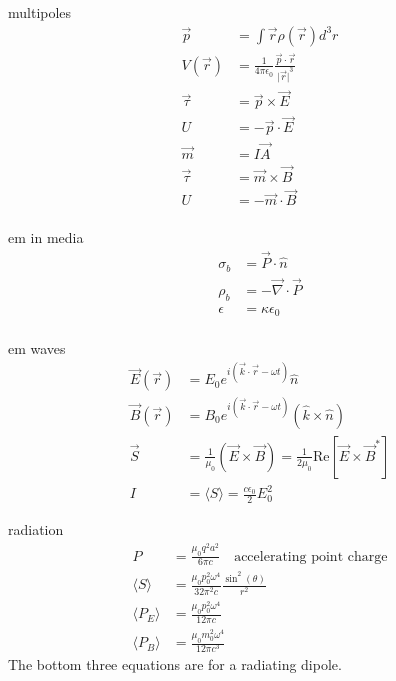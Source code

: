 \documentclass[avery5388, frame]{flashcards}
\begin{document}
\begin{flashcard}{multipoles}
  {
    \begin{align*}
      \vec{p} &= \int \vec{r} \rho(\vec{r}) d^{3}r\\
      V(\vec{r}) &= \frac{1}{4 \pi \epsilon_{0}} \frac{\vec{p} \cdot \vec{r}}{{\lvert \vec{r} \lvert}^{3}}\\
      \vec{\tau} &= \vec{p} \times \vec{E}\\
      U &= - \vec{p} \cdot \vec{E}\\
      \vec{m} &= I \vec{A}\\
      \vec{\tau} &= \vec{m} \times \vec{B}\\
      U &= - \vec{m} \cdot \vec{B}\\
    \end{align*}
  }
\end{flashcard}

\begin{flashcard}{em in media}
  {
    \begin{align*}
      \sigma_{b} &= \vec{P} \cdot \hat{n}\\
      \rho_{b} &= - \vec{\nabla} \cdot \vec{P}\\
      \epsilon &= \kappa \epsilon_{0}\\
    \end{align*}
  }
\end{flashcard}

\begin{flashcard}{em waves}
  {
    \begin{align*}
      \vec{E}(\vec{r}) &= E_{0} e^{i(\vec{k} \cdot \vec{r} - \omega t)} \hat{n}\\
      \vec{B}(\vec{r}) &= B_{0} e^{i(\vec{k} \cdot \vec{r} - \omega t)} (\hat{k} \times \hat{n})\\
      \vec{S} &= \frac{1}{\mu_{0}} (\vec{E} \times \vec{B}) = \frac{1}{2 \mu_{0}} \textrm{Re}[\vec{E} \times \vec{B}^{*}]\\
      I &= \langle S \rangle = \frac{c \epsilon_{0}}{2} E_{0}^{2}
    \end{align*}
  }
\end{flashcard}

\begin{flashcard}{radiation}
  {
    \begin{align*}
      P &= \frac{\mu_{0} q^{2} a^{2}}{6 \pi c} \quad \textrm{accelerating point charge}\\
      \langle S \rangle &= \frac{\mu_{0} p_{0}^{2} \omega^{4}}{32 \pi^{2} c} \frac{\sin^{2}(\theta)}{r^{2}}\\
      \langle P_{E} \rangle &= \frac{\mu_{0} p_{0}^{2} \omega^{4}}{12 \pi c}\\
      \langle P_{B} \rangle &= \frac{\mu_{0} m_{0}^{2} \omega^{4}}{12 \pi c^{3}}
    \end{align*}
    The bottom three equations are for a radiating dipole.
  }
\end{flashcard}
\end{document}
